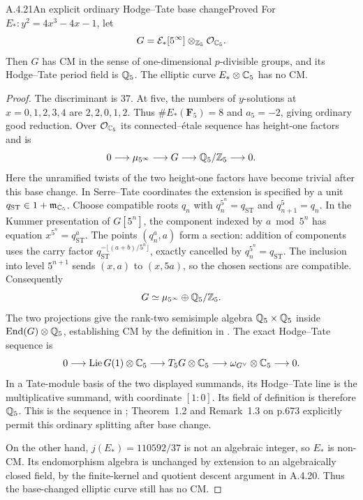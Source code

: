 \begin{result}{A.4.21}{An explicit ordinary Hodge--Tate base change}{Proved}
For $E_*:y^2=4x^3-4x-1$, let
\[
 G=\mathcal E_*[5^\infty]\otimes_{\mathbb Z_5}\mathcal O_{\mathbb C_5}.
\]
Then $G$ has CM in the sense of one-dimensional $p$-divisible groups, and its Hodge--Tate period field is $\mathbb Q_5$. The elliptic curve $E_*\otimes\mathbb C_5$ has no CM.
\end{result}
\begin{proof}
The discriminant is $37$. At five, the numbers of $y$-solutions at $x=0,1,2,3,4$ are $2,2,0,1,2$. Thus $\#E_*(\mathbf F_5)=8$ and $a_5=-2$, giving ordinary good reduction. Over $\mathcal O_{\mathbb C_5}$ its connected--\'etale sequence has height-one factors and is
\[
 0\longrightarrow\mu_{5^\infty}\longrightarrow G
 \longrightarrow\mathbb Q_5/\mathbb Z_5\longrightarrow0.
\]
Here the unramified twists of the two height-one factors have become trivial after this base change. In Serre--Tate coordinates the extension is specified by a unit $q_{\mathrm{ST}}\in1+\mathfrak m_{\mathbb C_5}$. Choose compatible roots $q_n$ with $q_n^{5^n}=q_{\mathrm{ST}}$ and $q_{n+1}^5=q_n$. In the Kummer presentation of $G[5^n]$, the component indexed by $a\bmod5^n$ has equation $x^{5^n}=q_{\mathrm{ST}}^a$. The points $(q_n^a,a)$ form a section: addition of components uses the carry factor $q_{\mathrm{ST}}^{-\lfloor(a+b)/5^n\rfloor}$, exactly cancelled by $q_n^{5^n}=q_{\mathrm{ST}}$. The inclusion into level $5^{n+1}$ sends $(x,a)$ to $(x,5a)$, so the chosen sections are compatible. Consequently
\[
 G\simeq\mu_{5^\infty}\oplus\mathbb Q_5/\mathbb Z_5.
\]
The two projections give the rank-two semisimple algebra $\mathbb Q_5\times\mathbb Q_5$ inside $\operatorname{End}(G)\otimes\mathbb Q_5$, establishing CM by the definition in \cite[p.673]{EllHowe2018}. The exact Hodge--Tate sequence is
\[
 0\longrightarrow\operatorname{Lie}G(1)\otimes\mathbb C_5
 \longrightarrow T_5G\otimes\mathbb C_5
 \longrightarrow\omega_{G^\vee}\otimes\mathbb C_5\longrightarrow0.
\]
In a Tate-module basis of the two displayed summands, its Hodge--Tate line is the multiplicative summand, with coordinate $[1:0]$. Its field of definition is therefore $\mathbb Q_5$. This is the sequence in \cite[(1.1), p.672]{EllHowe2018}; Theorem~1.2 and Remark~1.3 on p.673 explicitly permit this ordinary splitting after base change.

On the other hand, $j(E_*)=110592/37$ is not an algebraic integer, so $E_*$ is non-CM. Its endomorphism algebra is unchanged by extension to an algebraically closed field, by the finite-kernel and quotient descent argument in A.4.20. Thus the base-changed elliptic curve still has no CM.
\end{proof}


